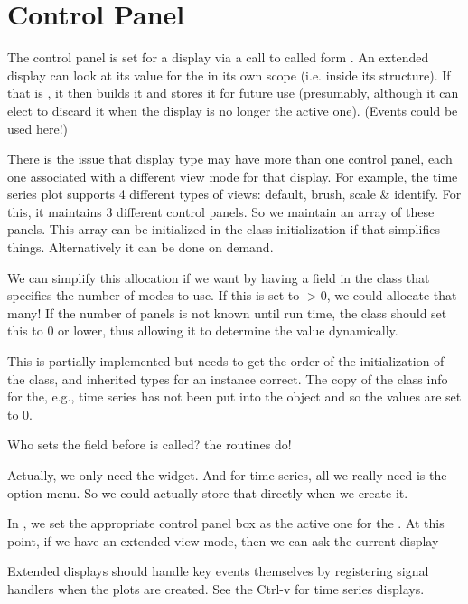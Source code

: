 \documentclass{article}
\begin{document}
\section{Control Panel}

The control panel is set for a display via a call to
 called form .  An
extended display can look at its value for the  in
its own scope (i.e. inside its  structure).
If that is \Cnull, it then builds it and stores it for future use
(presumably, although it can elect to discard it when the display is
no longer the active one). (Events could be used here!)

There is the issue that display type may have more than one control
panel, each one associated with a different view mode for that
display.  For example, the time series plot supports 4 different types
of views: default, brush, scale \& identify.  For this, it maintains 3
different control panels.  So we maintain an array of these panels.
This array can be initialized in the class initialization if that
simplifies things. Alternatively it can be done on demand.

We can simplify this allocation if we want by having a field in the
class that specifies the number of modes to use.  If this is set to $>
0$, we could allocate that many!  If the number of panels is not known
until run time, the class should set this to 0 or lower, thus allowing
it to determine the value dynamically. 

 This is partially implemented but needs to get the order of the
initialization of the class, and inherited types for an instance
correct. The copy of the class info for the, e.g., time series has not
been put into the object and so the values are set to $0$.



Who sets the  field before
 is called?  the 
routines do!


Actually, we only need the widget.  And for time series, all we really
need is the option menu.  So we could actually store that directly
when we create it.

In , we set the appropriate control panel box
as the active one for the .  At this point, if
we have an extended view mode, then we can ask the current display


Extended displays should handle key events themselves by registering
signal handlers when the plots are created.  See the Ctrl-v for time
series displays.
\end{document}
